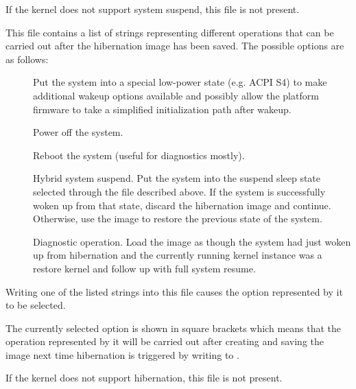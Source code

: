 \documentclass[a4paper,8pt,english]{sphinxmanual}
\begin{document}
\begin{description}
If the kernel does not support system suspend, this file is not present.

\item[{\code{disk}}] \leavevmode
This file contains a list of strings representing different operations
that can be carried out after the hibernation image has been saved.  The
possible options are as follows:
\begin{description}
\item[{}] \leavevmode
Put the system into a special low-power state (e.g. ACPI S4) to
make additional wakeup options available and possibly allow the
platform firmware to take a simplified initialization path after
wakeup.

\item[{}] \leavevmode
Power off the system.

\item[{}] \leavevmode
Reboot the system (useful for diagnostics mostly).

\item[{}] \leavevmode
Hybrid system suspend.  Put the system into the suspend sleep
state selected through the  file described above.
If the system is successfully woken up from that state, discard
the hibernation image and continue.  Otherwise, use the image
to restore the previous state of the system.

\item[{}] \leavevmode
Diagnostic operation.  Load the image as though the system had
just woken up from hibernation and the currently running kernel
instance was a restore kernel and follow up with full system
resume.

\end{description}

Writing one of the listed strings into this file causes the option
represented by it to be selected.

The currently selected option is shown in square brackets which means
that the operation represented by it will be carried out after creating
and saving the image next time hibernation is triggered by writing
 to .

If the kernel does not support hibernation, this file is not present.

\end{description}
\end{document}
